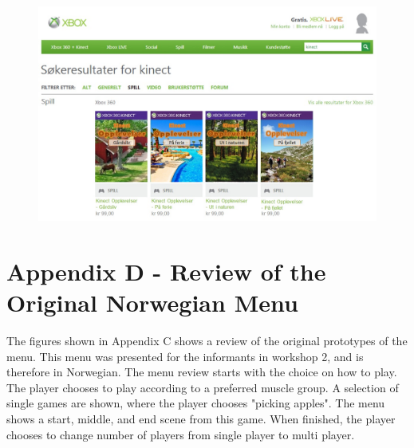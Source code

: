 \begin{figure} [H]
\centering
\includegraphics[scale=0.5, angle=90]{SpillXboxNYNY.jpg}
\label{fig:videogameseriesHeleNorsk}
\end{figure}

\newpage
\section*{Appendix D - Review of the Original Norwegian Menu}
\label{app:menureview}

The figures shown in Appendix C shows a review of the original prototypes of the menu. This menu was presented for the informants in workshop 2, and is therefore in Norwegian. The menu review starts with the choice on how to play. The player chooses to play according to a preferred muscle group. A selection of single games are shown, where the player chooses "picking apples". The menu shows a start, middle, and end scene from this game. When finished, the player chooses to change number of players from single player to multi player.  

